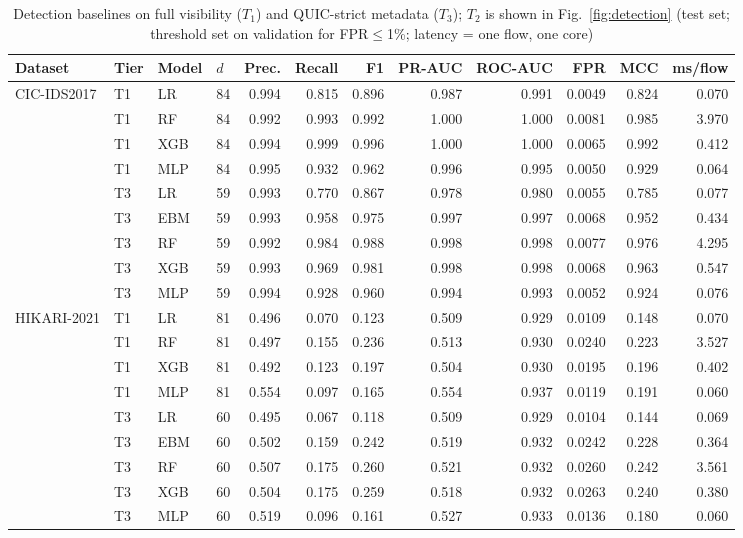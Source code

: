 \begin{table}[!htbp]
\centering
\caption{Detection baselines on full visibility ($T_1$) and QUIC-strict metadata ($T_3$); $T_2$ is shown in Fig.~\ref{fig:detection} (test set; threshold set on validation for FPR$\leq$1\%; latency = one flow, one core)}
\label{tab:detection}
\scriptsize
\setlength{\tabcolsep}{3.5pt}
\begin{tabular}{llllrrrrrrrr}
\toprule
\textbf{Dataset} & \textbf{Tier} & \textbf{Model} & \textbf{$d$} & \textbf{Prec.} & \textbf{Recall} & \textbf{F1} & \textbf{PR-AUC} & \textbf{ROC-AUC} & \textbf{FPR} & \textbf{MCC} & \textbf{ms/flow} \\
\midrule
CIC-IDS2017 & T1 & LR & 84 & 0.994 & 0.815 & 0.896 & 0.987 & 0.991 & 0.0049 & 0.824 & 0.070 \\
 & T1 & RF & 84 & 0.992 & 0.993 & 0.992 & 1.000 & 1.000 & 0.0081 & 0.985 & 3.970 \\
 & T1 & XGB & 84 & 0.994 & 0.999 & 0.996 & 1.000 & 1.000 & 0.0065 & 0.992 & 0.412 \\
 & T1 & MLP & 84 & 0.995 & 0.932 & 0.962 & 0.996 & 0.995 & 0.0050 & 0.929 & 0.064 \\
 & T3 & LR & 59 & 0.993 & 0.770 & 0.867 & 0.978 & 0.980 & 0.0055 & 0.785 & 0.077 \\
 & T3 & EBM & 59 & 0.993 & 0.958 & 0.975 & 0.997 & 0.997 & 0.0068 & 0.952 & 0.434 \\
 & T3 & RF & 59 & 0.992 & 0.984 & 0.988 & 0.998 & 0.998 & 0.0077 & 0.976 & 4.295 \\
 & T3 & XGB & 59 & 0.993 & 0.969 & 0.981 & 0.998 & 0.998 & 0.0068 & 0.963 & 0.547 \\
 & T3 & MLP & 59 & 0.994 & 0.928 & 0.960 & 0.994 & 0.993 & 0.0052 & 0.924 & 0.076 \\
\midrule
HIKARI-2021 & T1 & LR & 81 & 0.496 & 0.070 & 0.123 & 0.509 & 0.929 & 0.0109 & 0.148 & 0.070 \\
 & T1 & RF & 81 & 0.497 & 0.155 & 0.236 & 0.513 & 0.930 & 0.0240 & 0.223 & 3.527 \\
 & T1 & XGB & 81 & 0.492 & 0.123 & 0.197 & 0.504 & 0.930 & 0.0195 & 0.196 & 0.402 \\
 & T1 & MLP & 81 & 0.554 & 0.097 & 0.165 & 0.554 & 0.937 & 0.0119 & 0.191 & 0.060 \\
 & T3 & LR & 60 & 0.495 & 0.067 & 0.118 & 0.509 & 0.929 & 0.0104 & 0.144 & 0.069 \\
 & T3 & EBM & 60 & 0.502 & 0.159 & 0.242 & 0.519 & 0.932 & 0.0242 & 0.228 & 0.364 \\
 & T3 & RF & 60 & 0.507 & 0.175 & 0.260 & 0.521 & 0.932 & 0.0260 & 0.242 & 3.561 \\
 & T3 & XGB & 60 & 0.504 & 0.175 & 0.259 & 0.518 & 0.932 & 0.0263 & 0.240 & 0.380 \\
 & T3 & MLP & 60 & 0.519 & 0.096 & 0.161 & 0.527 & 0.933 & 0.0136 & 0.180 & 0.060 \\
\bottomrule
\end{tabular}
\end{table}

